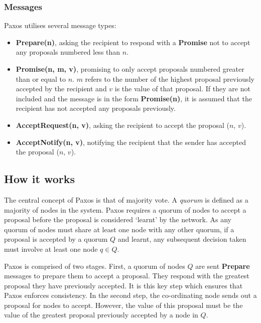 \documentclass[12pt,twoside,notitlepage]{report}
\newcommand{\msg}[1] {{\bf #1}}         %
\begin{document}
\subsubsection*{Messages}

Paxos utilises several message types:

\begin{itemize}
\item \msg{Prepare(n)}, asking the recipient to respond with a \msg{Promise} not to
	accept any proposals numbered less than $n$.
\item \msg{Promise(n, m, v)}, promising to only accept proposals numbered greater than or equal to
	$n$. $m$ refers to the number of the highest proposal previously accepted by the recipient and
	$v$ is the value of that proposal. If they are not included and the message is in the form
	\msg{Promise(n)}, it is assumed that the recipient has not accepted any proposals
		previously.
\item \msg{AcceptRequest(n, v)}, asking the recipient to accept the proposal ($n$, $v$).
\item \msg{AcceptNotify(n, v)}, notifying the recipient that the sender has accepted the proposal
	($n$, $v$).
\end{itemize}

\subsection{How it works}

\label{sec:how-paxos-works}

The central concept of Paxos is that of majority vote. A \emph{quorum} is defined as a majority of
nodes in the system.  Paxos requires a quorum of nodes to accept a proposal before the proposal is
considered `learnt' by the network. As any quorum of nodes must share at least one node with any
other quorum, if a proposal is accepted by a quorum $Q$ and learnt, any subsequent decision taken
must involve at least one node $q \in Q$.

Paxos is comprised of two stages. First, a quorum of nodes $Q$ are sent \msg{Prepare} messages to
prepare them to accept a proposal. They respond with the greatest proposal they have previously
accepted. It is this key step which ensures that Paxos enforces consistency. In the second step,
the co-ordinating node sends out a proposal for nodes to accept. However, the value of this
proposal must be the value of the greatest proposal previously accepted by a node in $Q$.
\end{document}
